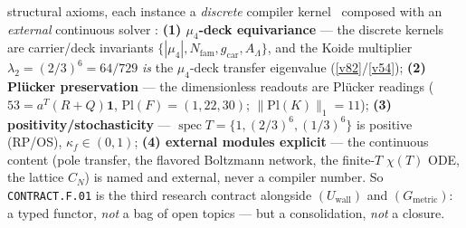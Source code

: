 \documentclass[11pt,a4paper]{article}
\newcommand{\Nfam}{N_{\mathrm{fam}}}
\newcommand{\gcar}{g_{\mathrm{car}}}
\begin{document}
structural axioms, each instance a \emph{discrete} compiler kernel \mE\ composed with an \emph{external}
continuous solver \mC: \textbf{(1) $\mu_4$-deck equivariance} --- the discrete kernels are carrier/deck
invariants $\{|\mu_4|,\Nfam,\gcar,A_\Lambda\}$, and the Koide multiplier $\lambda_2{=}(2/3)^6{=}64/729$
\emph{is} the $\mu_4$-deck transfer eigenvalue (\vref{v82}/\vref{v54}); \textbf{(2) Pl\"ucker preservation}
--- the dimensionless readouts are Pl\"ucker readings ($53{=}a^T(R{+}Q)\mathbf1$, $\mathrm{Pl}(F){=}(1,22,30)$;
$\|\mathrm{Pl}(K)\|_1{=}11$); \textbf{(3) positivity/stochasticity} --- $\operatorname{spec}T{=}\{1,(2/3)^6,(1/3)^6\}$
is positive (RP/OS), $\kappa_f{\in}(0,1)$; \textbf{(4) external modules explicit} --- the continuous content
(pole transfer, the flavored Boltzmann network, the finite-$T$ $\chi(T)$ ODE, the lattice $C_N$) is named and
external, never a compiler number. So \texttt{CONTRACT.F.01} is the third research contract alongside
$(U_{\mathrm{wall}})$ and $(G_{\mathrm{metric}})$: a typed functor, \emph{not} a bag of open topics --- but a
consolidation, \emph{not} a closure.
\end{document}
